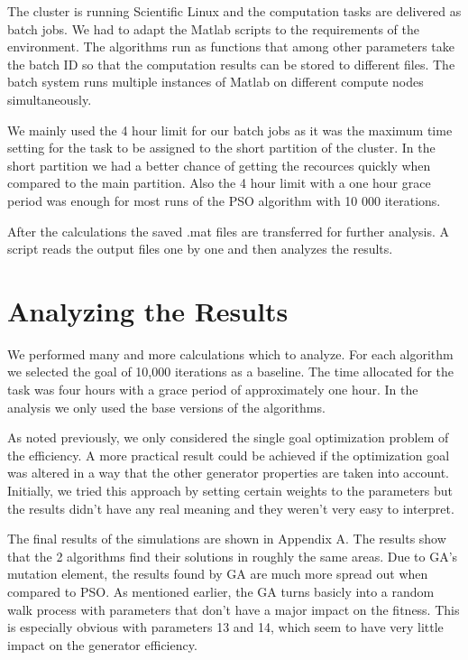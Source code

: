 \documentclass[twoside]{article}
\begin{document}
\begin{multicols}{2}
	The cluster is running Scientific Linux and the computation tasks are delivered as batch jobs. We had to adapt the Matlab scripts to the requirements of the environment. The algorithms run as functions that among other parameters take the batch ID so that the computation results can be stored to different files. The batch system runs multiple instances of Matlab on different compute nodes simultaneously. 
	
		We mainly used the 4 hour limit for our batch jobs as it was the maximum time setting for the task to be assigned to the short partition of the cluster. In the short partition we had a better chance of getting the recources quickly when compared to the main partition. Also the 4 hour limit with a one hour grace period was enough for most runs of the PSO algorithm with 10 000 iterations.
	
	After the calculations the saved .mat files are transferred for further analysis. A script reads the output files one by one and then analyzes the results.
	
	
	
\section{Analyzing the Results}
We performed many and more calculations which to analyze. For each algorithm we selected the goal of 10,000 iterations as a baseline. The time allocated for the task was four hours with a grace period of approximately one hour. In the analysis we only used the base versions of the algorithms. 

As noted previously, we only considered the single goal optimization problem of the efficiency. A more practical result could be achieved if the optimization goal was altered in a way that the other generator properties are taken into account. Initially, we tried this approach by setting certain weights to the parameters but the results didn't have any real meaning and they weren't very easy to interpret. 

The final results of the simulations are shown in Appendix A. The results show that the 2 algorithms find their solutions in roughly the same areas. Due to GA's mutation element, the results found by GA are much more spread out when compared to PSO. As mentioned earlier, the GA turns basicly into a random walk process with parameters that don't have a major impact on the fitness. This is especially obvious with parameters 13 and 14, which seem to have very little impact on the generator efficiency.


\end{multicols}
\end{document}
